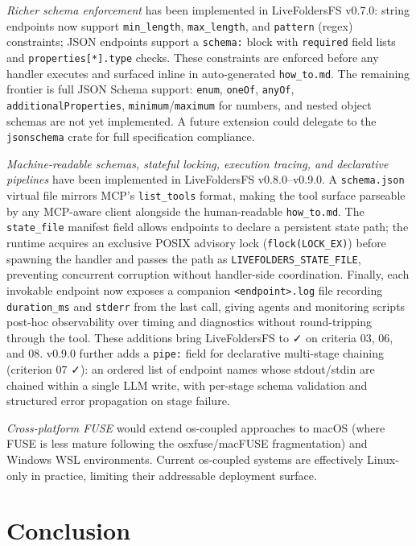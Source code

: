 \documentclass[
  11pt,
]{article}
\begin{document}
\emph{Richer schema enforcement} has been implemented in LiveFoldersFS
v0.7.0: string endpoints now support \texttt{min\_length},
\texttt{max\_length}, and \texttt{pattern} (regex) constraints; JSON
endpoints support a \texttt{schema:} block with \texttt{required} field
lists and \texttt{properties{[}*{]}.type} checks. These constraints are
enforced before any handler executes and surfaced inline in
auto-generated \texttt{how\_to.md}. The remaining frontier is full JSON
Schema support: \texttt{enum}, \texttt{oneOf}, \texttt{anyOf},
\texttt{additionalProperties}, \texttt{minimum}/\texttt{maximum} for
numbers, and nested object schemas are not yet implemented. A future
extension could delegate to the \texttt{jsonschema} crate for full
specification compliance.

\emph{Machine-readable schemas, stateful locking, execution tracing, and
declarative pipelines} have been implemented in LiveFoldersFS
v0.8.0--v0.9.0. A \texttt{schema.json} virtual file mirrors MCP's
\texttt{list\_tools} format, making the tool surface parseable by any
MCP-aware client alongside the human-readable \texttt{how\_to.md}. The
\texttt{state\_file} manifest field allows endpoints to declare a
persistent state path; the runtime acquires an exclusive POSIX advisory
lock (\texttt{flock(LOCK\_EX)}) before spawning the handler and passes
the path as \texttt{LIVEFOLDERS\_STATE\_FILE}, preventing concurrent
corruption without handler-side coordination. Finally, each invokable
endpoint now exposes a companion
\texttt{\textless{}endpoint\textgreater{}.log} file recording
\texttt{duration\_ms} and \texttt{stderr} from the last call, giving
agents and monitoring scripts post-hoc observability over timing and
diagnostics without round-tripping through the tool. These additions
bring LiveFoldersFS to ✓ on criteria 03, 06, and 08. v0.9.0 further adds
a \texttt{pipe:} field for declarative multi-stage chaining (criterion
07 ✓): an ordered list of endpoint names whose stdout/stdin are chained
within a single LLM write, with per-stage schema validation and
structured error propagation on stage failure.

\emph{Cross-platform FUSE} would extend os-coupled approaches to macOS
(where FUSE is less mature following the osxfuse/macFUSE fragmentation)
and Windows WSL environments. Current os-coupled systems are effectively
Linux-only in practice, limiting their addressable deployment surface.

\hypertarget{conclusion}{%
\section{Conclusion}\label{conclusion}}
\end{document}
